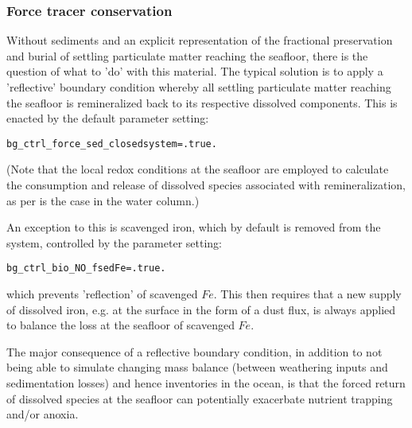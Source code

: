 %
\newpage
\subsubsection{Force tracer conservation}
\vspace{2mm}

Without sediments and an explicit representation of the fractional preservation and burial of settling particulate matter reaching the seafloor, there is the question of what to 'do' with this material. The typical solution is to apply a 'reflective' boundary condition whereby all settling particulate matter reaching the seafloor is remineralized back to its respective dissolved components. This is enacted by the default parameter setting:
\vspace{-1mm}\small\begin{verbatim}
bg_ctrl_force_sed_closedsystem=.true.
\end{verbatim}\normalsize\vspace{-1mm}
(Note that the local redox conditions at the seafloor are employed to calculate the consumption and release of dissolved species associated with remineralization, as per is the case in the water column.)

An exception to this is scavenged iron, which by default is removed from the system, controlled by the parameter setting:
\vspace{-1mm}\small\begin{verbatim}
bg_ctrl_bio_NO_fsedFe=.true.
\end{verbatim}\normalsize\vspace{-1mm}
which prevents 'reflection' of scavenged \(Fe\). This then requires that a new supply of dissolved iron, e.g. at the surface in the form of a dust flux, is always applied to balance the loss at the seafloor of scavenged \(Fe\).

The major consequence of a reflective boundary condition, in addition to not being able to simulate changing mass balance (between weathering inputs and sedimentation losses) and hence inventories in the ocean, is that the forced return of dissolved species at the seafloor can potentially exacerbate nutrient trapping and/or anoxia.

